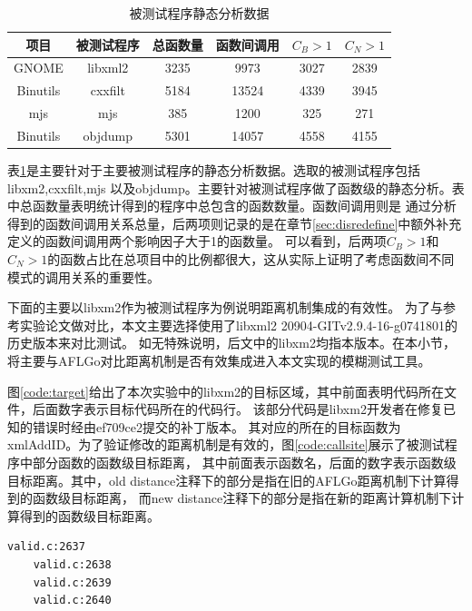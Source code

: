 \documentclass[bachelor]{njupthesis}
\begin{document}
\begin{table}[hbp]
	\centering
	\caption{被测试程序静态分析数据}\label{tab:sa}
	\begin{tabular}{|c|c|c|c|c|c|}
	  \hline
	  项目 & 被测试程序 & 总函数量  &函数间调用 &$C_B >1$ & $C_N >1$ \\
	  \hline
	  GNOME & libxml2 & 3235 &9973  & 3027 &  2839\\
	  \hline
	  Binutils & cxxfilt & 5184 & 13524  & 4339 & 3945\\
	  \hline
	  mjs & mjs & 385 & 1200  &  325 & 271\\
	  \hline
	  Binutils & objdump & 5301 & 14057 &  4558 &  4155\\
	  \hline  
	\end{tabular}
  \end{table}
  \vspace{6pt}
表\ref{tab:sa}是主要针对于主要被测试程序的静态分析数据。选取的被测试程序包括libxm2\cite{Libxml2},cxxfilt\cite{cxxfilt},mjs\cite{mjs}
以及objdump\cite{objdump}。主要针对被测试程序做了函数级的静态分析。表中总函数量表明统计得到的程序中总包含的函数数量。函数间调用则是
通过分析得到的函数间调用关系总量，后两项则记录的是在章节\ref{sec:disredefine}中额外补充定义的函数间调用两个影响因子大于1的函数量。
可以看到，后两项$C_B >1$和 $C_N >1$的函数占比在总项目中的比例都很大，这从实际上证明了考虑函数间不同模式的调用关系的重要性。

下面的主要以libxm2作为被测试程序为例说明距离机制集成的有效性。
为了与参考实验论文做对比，本文主要选择使用了libxml2 20904-GITv2.9.4-16-g0741801的历史版本来对比测试。
如无特殊说明，后文中的libxm2均指本版本。在本小节，将主要与AFLGo对比距离机制是否有效集成进入本文实现的模糊测试工具。

图\ref{code:target}给出了本次实验中的libxm2的目标区域，其中前面表明代码所在文件，后面数字表示目标代码所在的代码行。
该部分代码是libxm2开发者在修复已知的错误时经由ef709ce2提交的补丁版本。
其对应的所在的目标函数为xmlAddID。为了验证修改的距离机制是有效的，图\ref{code:callsite}展示了被测试程序中部分函数的函数级目标距离，
其中前面表示函数名，后面的数字表示函数级目标距离。其中，old distance注释下的部分是指在旧的AFLGo距离机制下计算得到的函数级目标距离，
而new distance注释下的部分是指在新的距离计算机制下计算得到的函数级目标距离。

\renewcommand{\thelstlisting}{5.\arabic{lstlisting}}
\begin{lstlisting}[caption={指定目标代码区域行号},label={code:target}]
	valid.c:2637
	valid.c:2638
	valid.c:2639
	valid.c:2640
\end{lstlisting}
\end{document}

